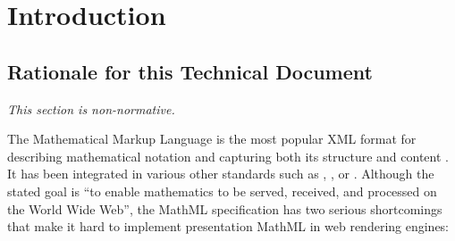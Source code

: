 \section{Introduction}

\subsection{Rationale for this Technical Document}

{\em This section is non-normative.}

The Mathematical Markup Language is the most popular XML format for describing
mathematical notation and capturing both its structure and content
\cite{MathML3}. It has been integrated in various other standards such as
\cite{HTML5}, \cite{EPUB3}, \cite{ODF1} or \cite{Daisy3}. Although
the stated goal is ``to enable mathematics to be served, received, and
processed on the World Wide Web'', the MathML specification has
two serious shortcomings that make it hard to implement presentation MathML in
web rendering engines:

